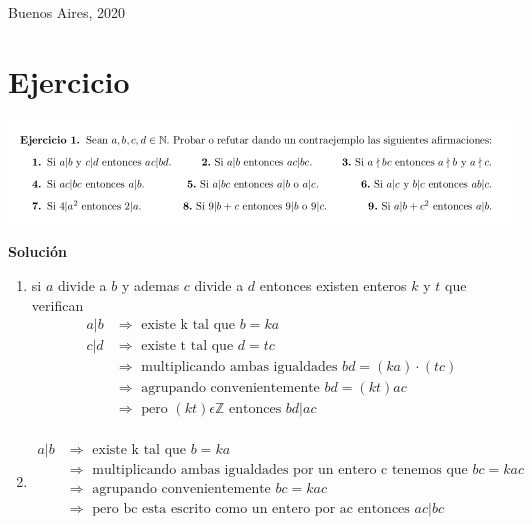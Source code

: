 \documentclass[12pt]{book}
\begin{document}
\noindent Buenos Aires, 2020

\newpage
\tableofcontents

\chapter{Ejercicio}
\begin{center}
\includegraphics[scale=0.55]{./img/ej1.png}
\end {center}
\textbf{Soluci\'on}
\begin{enumerate}
\item si $a$ divide a $b$ y ademas $c$ divide a $d$ entonces existen enteros $k$ y $t$ que verifican
\begin{align*}
a\vert b &\Rightarrow \text{ existe k tal que } b = k a \\
c\vert d &\Rightarrow \text{ existe t tal que } d = t c \\
&\Rightarrow \text{ multiplicando ambas igualdades } bd = (k a)\cdot (tc)   \\
&\Rightarrow \text{ agrupando convenientemente } bd = (kt) ac \\
&\Rightarrow \text{ pero } (kt) \epsilon \mathbb{Z} 	\text{ entonces } bd \vert ac \\
\end{align*}
\item 
\begin{align*}
a\vert b &\Rightarrow \text{ existe k tal que } b = k a \\
&\Rightarrow \text{ multiplicando ambas igualdades por un entero c tenemos que } bc = kac   \\
&\Rightarrow \text{ agrupando convenientemente } bc = k ac \\
&\Rightarrow \text{ pero bc esta escrito como un entero por ac entonces } ac \vert bc \\
\end{align*}
\end{enumerate}
\end{document}
